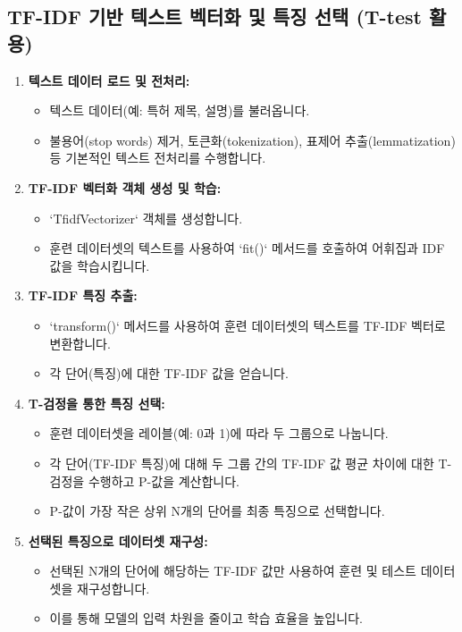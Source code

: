 \documentclass[11pt,a4paper]{article}
\begin{document}
\subsection{TF-IDF 기반 텍스트 벡터화 및 특징 선택 (T-test 활용)}
\begin{enumerate}
    \item \textbf{텍스트 데이터 로드 및 전처리:}
    \begin{itemize}
        \item 텍스트 데이터(예: 특허 제목, 설명)를 불러옵니다.
        \item 불용어(stop words) 제거, 토큰화(tokenization), 표제어 추출(lemmatization) 등 기본적인 텍스트 전처리를 수행합니다.
    \end{itemize}
    \item \textbf{TF-IDF 벡터화 객체 생성 및 학습:}
    \begin{itemize}
        \item `TfidfVectorizer` 객체를 생성합니다.
        \item 훈련 데이터셋의 텍스트를 사용하여 `fit()` 메서드를 호출하여 어휘집과 IDF 값을 학습시킵니다.
    \end{itemize}
    \item \textbf{TF-IDF 특징 추출:}
    \begin{itemize}
        \item `transform()` 메서드를 사용하여 훈련 데이터셋의 텍스트를 TF-IDF 벡터로 변환합니다.
        \item 각 단어(특징)에 대한 TF-IDF 값을 얻습니다.
    \end{itemize}
    \item \textbf{T-검정을 통한 특징 선택:}
    \begin{itemize}
        \item 훈련 데이터셋을 레이블(예: 0과 1)에 따라 두 그룹으로 나눕니다.
        \item 각 단어(TF-IDF 특징)에 대해 두 그룹 간의 TF-IDF 값 평균 차이에 대한 T-검정을 수행하고 P-값을 계산합니다.
        \item P-값이 가장 작은 상위 N개의 단어를 최종 특징으로 선택합니다.
    \end{itemize}
    \item \textbf{선택된 특징으로 데이터셋 재구성:}
    \begin{itemize}
        \item 선택된 N개의 단어에 해당하는 TF-IDF 값만 사용하여 훈련 및 테스트 데이터셋을 재구성합니다.
        \item 이를 통해 모델의 입력 차원을 줄이고 학습 효율을 높입니다.
    \end{itemize}
\end{enumerate}
\end{document}
